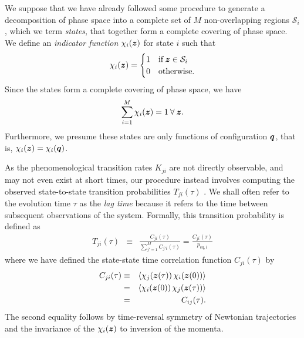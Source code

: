 We suppose that we have already followed some procedure to generate a decomposition of phase space into a complete set of $M$ non-overlapping regions $\mathcal{S}_i$, which we term \emph{states}, that together form a complete covering of phase space.  
We define an \emph{indicator function} $\chi_i({\mbox{\boldmath{$z$}}})$ for state $i$ such that
\begin{eqnarray}
\chi_i({\mbox{\boldmath{$z$}}}) = 
\begin{cases}
1 & \mathrm{if} \, {\mbox{\boldmath{$z$}}} \in \mathcal{S}_i \nonumber \\
0 & \mathrm{otherwise.}
\end{cases}
\end{eqnarray}
Since the states form a complete covering of phase space, we have
\begin{eqnarray}
\sum_{i=1}^M \chi_i({\mbox{\boldmath{$z$}}}) = 1 \: \forall \: {\mbox{\boldmath{$z$}}} . \nonumber
\end{eqnarray}
Furthermore, we presume these states are only functions of configuration ${\mbox{\boldmath{$q$}}}$, that is, $\chi_i({\mbox{\boldmath{$z$}}}) = \chi_i({\mbox{\boldmath{$q$}}})$.

As the phenomenological transition rates $K_{ji}$ are not directly observable, and may not even exist at short times, our procedure instead involves computing the observed state-to-state transition probabilities $T_{ji}(\tau)$ \cite{swope:2004a}.
We shall often refer to the evolution time $\tau$ as the \emph{lag time} because it refers to the time between subsequent observations of the system. 
Formally, this transition probability is defined as
\begin{eqnarray}
T_{ji}(\tau) &\equiv& \frac{C_{ji}(\tau)}{\sum\limits_{j'=1}^M C_{j'i}(\tau)} = \frac{C_{ji}(\tau)}{p_{\mathrm{eq},i}} \label{validation:equation:transition-probabilities}
\end{eqnarray}
where we have defined the state-state time correlation function $C_{ji}(\tau)$ by
\begin{eqnarray}
C_{ji}(\tau) &\equiv& \left< \chi_j({\mbox{\boldmath{$z$}}}(\tau)) \, \chi_i({\mbox{\boldmath{$z$}}}(0)) \right> \\
&=& \left< \chi_i({\mbox{\boldmath{$z$}}}(0)) \, \chi_j({\mbox{\boldmath{$z$}}}(\tau)) \right> \nonumber \\
&=& C_{ij}(\tau) \nonumber .
\end{eqnarray}
The second equality follows by time-reversal symmetry of Newtonian trajectories and the invariance of the $\chi_i({\mbox{\boldmath{$z$}}})$ to inversion of the momenta.

